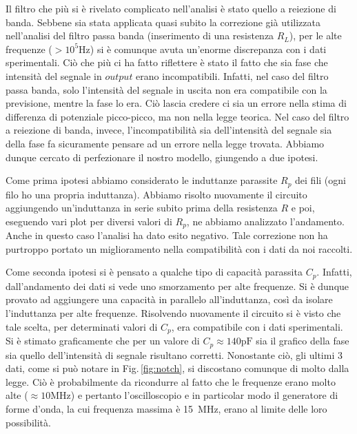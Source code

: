 Il filtro che più si è rivelato complicato nell'analisi è stato quello a reiezione di banda. Sebbene sia stata applicata quasi subito la correzione già utilizzata nell'analisi del filtro passa banda (inserimento di una resistenza $R_L$), per le alte frequenze ($>10^5 \si{\hertz}$) si è comunque avuta un'enorme discrepanza con i dati sperimentali. Ciò che più ci ha fatto riflettere è stato il fatto che sia fase che intensità del segnale in $output$ erano incompatibili. Infatti, nel caso del filtro passa banda, solo l'intensità del segnale in uscita non era compatibile con la previsione, mentre la fase lo era. Ciò lascia credere ci sia un errore nella stima di differenza di potenziale picco-picco, ma non nella legge teorica. Nel caso del filtro a reiezione di banda, invece, l'incompatibilità sia dell'intensità del segnale sia della fase fa sicuramente pensare ad un errore nella legge trovata. Abbiamo dunque cercato di perfezionare il nostro modello, giungendo a due ipotesi.

Come prima ipotesi abbiamo considerato le induttanze parassite $R_p$ dei fili (ogni filo ho una propria induttanza). Abbiamo risolto nuovamente il circuito aggiungendo un'induttanza in serie subito prima della resistenza $R$ e poi, eseguendo vari plot per diversi valori di $R_p$, ne abbiamo analizzato l'andamento. Anche in questo caso l'analisi ha dato esito negativo. Tale correzione non ha purtroppo portato un miglioramento nella compatibilità con i dati da noi raccolti.

Come seconda ipotesi si è pensato a qualche tipo di capacità parassita $C_p$. Infatti, dall'andamento dei dati si vede uno smorzamento per alte frequenze. Si è dunque provato ad aggiungere una capacità in parallelo all'induttanza, così da isolare l'induttanza per alte frequenze. Risolvendo nuovamente il circuito si è visto che tale scelta, per determinati valori di $C_p$, era compatibile con i dati sperimentali. Si è stimato graficamente che per un valore di $C_p \approx 140 \si{\pico\farad}$ sia il grafico della fase sia quello dell'intensità di segnale risultano corretti. Nonostante ciò, gli ultimi 3 dati, come si può notare in Fig.$\,$\ref{fig:notch}, si discostano comunque di molto dalla legge. Ciò è probabilmente da ricondurre al fatto che le frequenze erano molto alte ($\approx 10 \si{\mega\hertz}$) e pertanto l'oscilloscopio e in particolar modo il generatore di forme d'onda, la cui frequenza massima è \SI{15}{\mega\hertz}, erano al limite delle loro possibilità.








